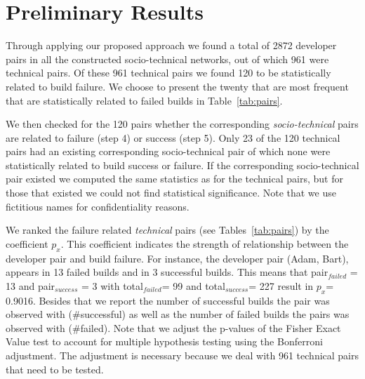 \documentclass[conference]{IEEEtran}
\begin{document}
\section{Preliminary Results}
Through applying our proposed approach we found a total of 2872 developer pairs in all the constructed
socio-technical networks, out of which 961 were technical pairs.
Of these 961 technical pairs we found 120 to be statistically related to build failure. 
We choose to present the twenty that are most frequent that are statistically related to failed builds in Table~\ref{tab:pairs}.

We then checked for the 120 pairs whether the corresponding \emph{socio-technical} pairs are related to failure (step 4) or success (step 5).
Only 23 of the 120 technical pairs had an existing corresponding socio-technical pair of which none were statistically related to build success or failure. 
If the corresponding socio-technical pair existed we computed the same statistics as for the technical pairs, but for those that existed we could not find statistical significance.
Note that we use fictitious names for confidentiality reasons.

We ranked the failure related \emph{technical} pairs (see Tables~\ref{tab:pairs})
by the coefficient $p_{x}$. This coefficient indicates the strength of
relationship between the developer pair and build failure. For instance, the
developer pair (Adam, Bart), appears in 13 failed builds and in 3
successful builds. This means that pair$_{failed}$ = 13 and pair$_{success}$ = 3
with total$_{failed}$= 99 and total$_{success}$= 227 result in $p_x$= 0.9016.
Besides that we report the number of successful builds the pair was observed with
(\#successful) as well as the number of failed builds the pairs was observed with
(\#failed). 
Note that we adjust the p-values of the Fisher Exact Value test to account for multiple hypothesis testing using the Bonferroni adjustment.
The adjustment is necessary because we deal with 961 technical pairs that need to be tested. 
\end{document}

